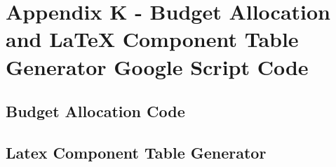 \newpage
\section{Appendix K - Budget Allocation and LaTeX Component Table Generator Google Script Code} \label{sec:appK}
\subsection{Budget Allocation Code}



\newpage
\subsection{Latex Component Table Generator}



\newpage